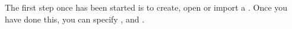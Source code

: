 The first step once \app{} has been started is to create, 
open or import a \gdproject{}. Once you have done this, 
you can specify \gdsuites{}, \gdcases{} and \gdsteps{}.
